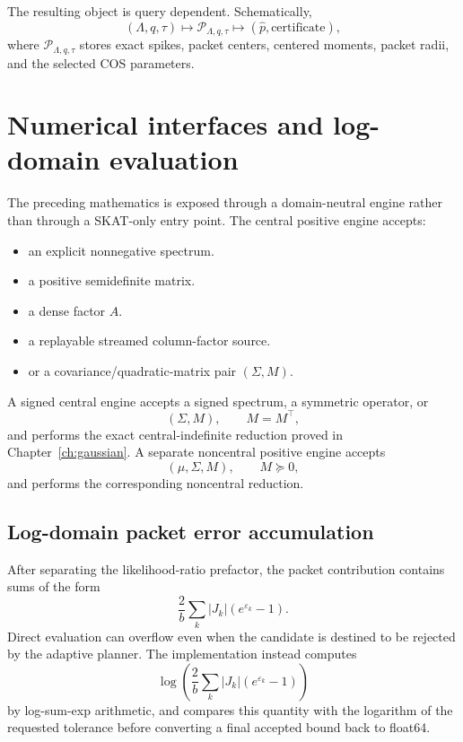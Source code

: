 The resulting object is query dependent. Schematically,
\begin{equation}
(\Lambda,q,\tau)
\longmapsto
\mathcal P_{\Lambda,q,\tau}
\longmapsto
(\widehat p,\text{certificate}),
\label{eq:compiler-map}
\end{equation}
where $\mathcal P_{\Lambda,q,\tau}$ stores exact spikes, packet centers, centered moments, packet radii, and the selected COS parameters.


\section{Numerical interfaces and log-domain evaluation}\label{sec:final-25}

The preceding mathematics is exposed through a domain-neutral engine rather
than through a SKAT-only entry point.  The central positive engine accepts:

\begin{itemize}
\item an explicit nonnegative spectrum.
\item a positive semidefinite matrix.
\item a dense factor \(A\).
\item a replayable streamed column-factor source.
\item or a covariance/quadratic-matrix pair
\((\Sigma,M)\).
\end{itemize}

A signed central engine accepts a signed spectrum, a symmetric operator, or
\[
(\Sigma,M),\qquad M=M^\top,
\]
and performs the exact central-indefinite reduction proved in Chapter~\ref{ch:gaussian}.  A
separate noncentral positive engine accepts
\[
(\mu,\Sigma,M),\qquad M\succeq0,
\]
and performs the corresponding noncentral reduction.

\subsection{Log-domain packet error accumulation}

After separating the likelihood-ratio prefactor, the packet contribution
contains sums of the form
\[
\frac{2}{b}
\sum_k
|J_k|
\left(
e^{\varepsilon_k}-1
\right).
\]
Direct evaluation can overflow even when the candidate is destined to be
rejected by the adaptive planner.  The implementation instead
computes
\[
\log\left(
\frac{2}{b}
\sum_k
|J_k|
\left(
e^{\varepsilon_k}-1
\right)
\right)
\]
by log-sum-exp arithmetic, and compares this quantity with the logarithm of
the requested tolerance before converting a final accepted bound back to
float64.

